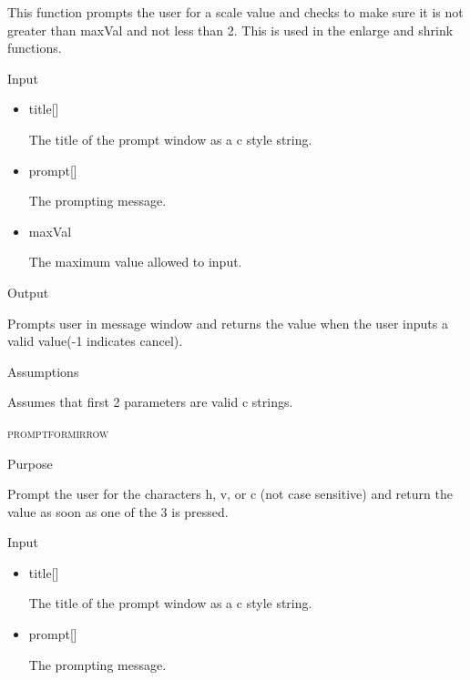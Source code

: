 \documentclass[pdftex, 11pt]{article}
\begin{document}
\begin{description}
\begin{description}
				This function prompts the user for a scale value and checks to make sure it
				is not greater than maxVal and not less than 2.  This is used in the enlarge
				and shrink functions.

			\item{Input}

				\begin{itemize}
					
					\item{title[]}

						The title of the prompt window as a c style string.

					\item{prompt[]}

						The prompting message.

					\item{maxVal}

						The maximum value allowed to input.

				\end{itemize}

			\item{Output}

				Prompts user in message window and returns the value when
				the user inputs a valid value(-1 indicates cancel).

			\item{Assumptions}

				Assumes that first 2 parameters are valid c strings.

		\end{description}


	\item{\textsc{promptformirrow}}

		\begin{description}
			\item{Purpose}

				Prompt the user for the characters h, v, or c (not case sensitive) and return
				the value as soon as one of the 3 is pressed.

			\item{Input}

				\begin{itemize}
					
					\item{title[]}

						The title of the prompt window as a c style string.

					\item{prompt[]}

						The prompting message.


\end{itemize}
\end{description}
\end{description}
\end{document}
